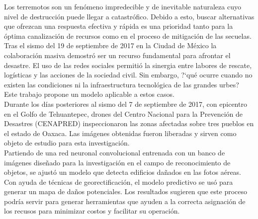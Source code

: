 Los terremotos son un fen\'omeno impredecible y de inevitable naturaleza cuyo nivel de destrucci\'on puede llegar a catastr\'ofico. Debido a esto, buscar alternativas que ofrezcan una respuesta efectiva y r\'apida es una prioridad tanto para la \'optima canalizaci\'on de recursos como en el proceso de mitigaci\'on de las secuelas.\\

Tras el sismo del 19 de septiembre de 2017 en la Ciudad de M\'exico la colaboraci\'on masiva demostr\'o ser un recurso fundamental para afrontar el desastre. El uso de las redes sociales permiti\'o la sinergia entre labores de rescate, log\'isticas y las acciones de la sociedad civil. Sin embargo, ?`qu\'e ocurre cuando no existen las condiciones ni la infraestructura tecnol\'ogica de las grandes urbes? Este trabajo propone un modelo aplicable a estos casos.\\

Durante los d\'ias posteriores al sismo del 7 de septiembre de 2017, con epicentro en el Golfo de Tehuantepec, drones del Centro Nacional para la Prevenci\'on de Desastres (CENAPRED) inspeccionaron las zonas afectadas sobre tres pueblos en el estado de Oaxaca. Las im\'agenes obtenidas fueron liberadas y sirven como objeto de estudio para esta investigaci\'on.\\

Partiendo de una red neuronal convolucional entrenada con un banco de im\'agenes dise\~nado para la investigaci\'on en el campo de reconocimiento de objetos, se ajust\'o un modelo que detecta edificios da\~nados en las fotos a\'ereas. Con ayuda de t\'ecnicas de georectificaci\'on, el modelo predictivo se us\'o para generar un mapa de da\~nos potenciales. Los resultados sugieren que este proceso podr\'ia servir para generar herramientas que ayuden a la correcta asignaci\'on de los recusos para minimizar costos y facilitar su operaci\'on.\\